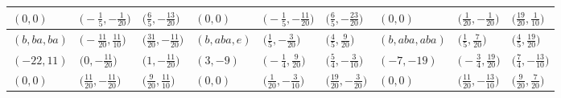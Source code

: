\documentclass[pdftex]{sigma}
\theoremstyle{definition}
\numberwithin{equation}{section}
\begin{document}
\begin{landscape}
\begin{table}[th]
\begin{tabular}{|lll|lll|lll|}
\\
$(0, 0)$ & $\bigl(-\frac{1}{5}, -\frac{1}{20}\bigr)$ & $\bigl(\frac{6}{5}, -\frac{13}{20}\bigr)$ & $(0, 0)$ & $\bigl(-\frac{1}{5}, -\frac{11}{20}\bigr)$ & $\bigl(\frac{6}{5}, -\frac{23}{20}\bigr)$ & $(0, 0)$ & $\bigl(\frac{1}{20}, -\frac{1}{20}\bigr)$ & $\bigl(\frac{19}{20}, \frac{1}{10}\bigr)$
\\\hline
$(b, ba, ba)$ & $\bigl(-\frac{11}{20}, \frac{11}{10}\bigr)$ & $\bigl(\frac{31}{20}, -\frac{11}{20}\bigr)$ & $(b, aba, e)$ & $\bigl(\frac{1}{5}, -\frac{3}{20}\bigr)$ & $\bigl(\frac{4}{5}, \frac{9}{20}\bigr)$ & $(b, aba, aba)$ & $\bigl(\frac{1}{5}, \frac{7}{20}\bigr)$ & $\bigl(\frac{4}{5}, \frac{19}{20}\bigr)$
\\
$(-22, 11)$ & $\bigl(0, -\frac{11}{20}\bigr)$ & $\bigl(1, -\frac{11}{20}\bigr)$ & $(3, -9)$ & $\bigl(-\frac{1}{4}, \frac{9}{20}\bigr)$ & $\bigl(\frac{5}{4}, -\frac{3}{10}\bigr)$ & $(-7, -19)$ & $\bigl(-\frac{3}{4}, \frac{19}{20}\bigr)$ & $\bigl(\frac{7}{4}, -\frac{13}{10}\bigr)$
\\
$(0, 0)$ & $\bigl(\frac{11}{20}, -\frac{11}{20}\bigr)$ & $\bigl(\frac{9}{20}, \frac{11}{10}\bigr)$ & $(0, 0)$ & $\bigl(\frac{1}{20}, -\frac{3}{10}\bigr)$ & $\bigl(\frac{19}{20}, -\frac{3}{20}\bigr)$ & $(0, 0)$ & $\bigl(\frac{11}{20}, -\frac{13}{10}\bigr)$ & $\bigl(\frac{9}{20}, \frac{7}{20}\bigr)$
\\\hline
\end{tabular}
\end{table}


\end{landscape}
\end{document}

